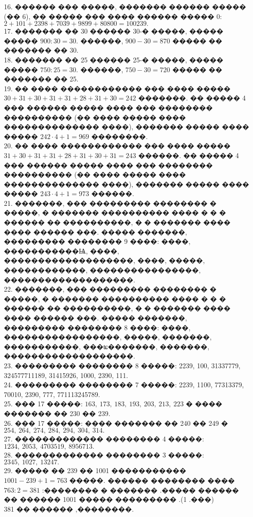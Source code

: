 \documentclass[12pt]{article}
\begin{document}
16. ������ ��� �����, ������� ������ ����� (�� 6), �� ����� ��� ���� ������ ����� 0: $2+101+2398+7039+9899+80800=100239.$\\
17. ������� �� 30 ������ 30-� �����, ����� ����� $900:30=30.$ ������, $900-30=870$ ����� �� ������� �� 30.\\
18. ������� �� 25 ������ 25-� �����, ����� ����� $750:25=30.$ ������, $750-30=720$ ����� �� ������� �� 25.\\
19. �� ���� ������������ ��� ���� ����� $30+31+30+31+31+28+31+30=242$ �������. �� ����� 4 ��� ������ ����� ���� ��� �������� ���������� (�� ���� ����� ���� �������������� ����), ������� ����� ���� ����� $242\cdot4+1=969$ ��������.\\
20. �� ���� ������������ ��� ���� ����� $31+30+31+31+28+31+30+31=243$ ������. �� ����� 4 ��� ������ ����� ���� ��� �������� ���������� (�� ���� ����� ���� �������������� ����), ������� ����� ���� ����� $243\cdot4+1=973$ ������.\\
21. �������, ��� ��������� �������� � �����, � ������� ���������� ���� � � � ������ �� ����������, � � ������� ���� ���� ������ ���. ����� �������, ��������� �������� 9 ����: ����, �����������Ѩ, ����, �������������������, ����, �����, ������������, ����������������, �������������������.\\
22. �������, ��� ��������� �������� � �����, � ������� ���������� ���� � � � ������ �� ����������, � � ������� ���� ���� ������ ���. ����� �������, ��������� �������� 8 ����: ����, �����������������, �����, �������, �����������, ���ʨ�������, �������, �������������������.\\
23. ��������� �������� 8 �����: 2239, 100, 31337779, 324577711189, 31415926, 1000, 2390, 111.\\
24. ��������� �������� 7 �����: 2239, 1100, 77313379, 70010, 2390, 777, 771113245789.\\
25. ��� 17 �����: $163,\ 173,\ 183,\ 193,\ 203,\ 213,\ 223$ � ���� ������� �� 230 �� 239.\\
26. ��� 17 �����: ���� ������� �� 240 �� 249 � $254,\ 264,\ 274,\ 284,\ 294,\ 304,\ 314.$\\
27. ������������� �������� 4 �����: $1234,\ 2053,\ 4703519,\ 8956713.$\\
28. ������������� �������� 3 �����: $2345,\ 1027,\ 13247.$\\
29. ����� �� 239 �� 1001 ����������� $1001-239+1=763$ �����. ׸���� �������� ������ ������ �����. ������� � ��������: $763:2=381$ (���. 1). ��������� ����� 1001 ������ �� ��������, ������ �� 381.\\
\end{document}
